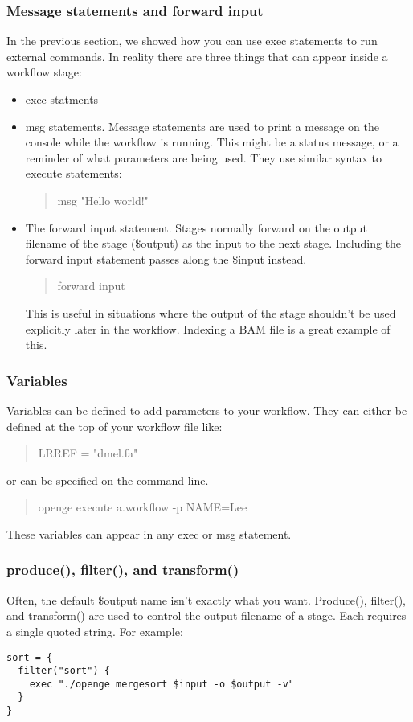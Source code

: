 \documentclass[11pt]{article}
\newcommand {\cmd}[1] {\begin{quote}#1\end{quote}}
\begin{document}
\subsubsection{Message statements and forward input}
In the previous section, we showed how you can use exec statements to run external commands. In reality there are three things that can appear inside a workflow stage:
\begin{itemize}
\item exec statments
\item msg statements. Message statements are used to print a message on the console while the workflow is running. This might be a status message, or a reminder of what parameters are being used.  They use similar syntax to execute statements:
\cmd{msg "Hello world!"}
\item The forward input statement. Stages normally forward on the output filename of the stage (\$output) as  the input to the next stage. Including the forward input statement passes along the \$input instead.
\cmd{forward input}
This is useful in situations where the output of the stage shouldn't be used explicitly later in the workflow. Indexing a BAM file is a great example of this.
\end{itemize}

\subsubsection{Variables}
Variables can be defined to add parameters to your workflow. They can either be defined at the top of your workflow file like:
\cmd{LRREF = "dmel.fa"}
or can be specified on the command line.
\cmd{openge execute a.workflow -p NAME=Lee}

These variables can appear in any exec or msg statement.

\subsubsection{produce(), filter(), and transform()}
Often, the default \$output name isn't exactly what you want. Produce(), filter(), and transform() are used to control the output filename of a stage. Each requires a single quoted string. For example:

\begin{verbatim}
sort = {
  filter("sort") {
    exec "./openge mergesort $input -o $output -v"
  }
}
\end{verbatim}
\end{document}
